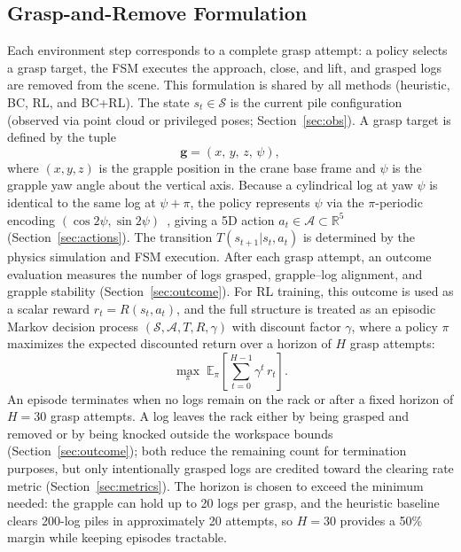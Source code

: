 \documentclass[letterpaper, 10 pt, conference]{ieeeconf}
\begin{document}
\subsection{Grasp-and-Remove Formulation}
\label{sec:formulation}
Each environment step corresponds to a complete grasp attempt: a policy selects a grasp target, the FSM executes the approach, close, and lift, and grasped logs are removed from the scene.
This formulation is shared by all methods (heuristic, BC, RL, and BC+RL).
The state $s_t \in \mathcal{S}$ is the current pile configuration (observed via point cloud or privileged poses; Section~\ref{sec:obs}).
A grasp target is defined by the tuple
\begin{equation}
    \mathbf{g} = (x,\, y,\, z,\, \psi),
\end{equation}
where $(x, y, z)$ is the grapple position in the crane base frame and $\psi$ is the grapple yaw angle about the vertical axis.
Because a cylindrical log at yaw $\psi$ is identical to the same log at $\psi + \pi$, the policy represents $\psi$ via the $\pi$-periodic encoding $(\cos 2\psi, \sin 2\psi)$~\cite{morrison2018closing}, giving a 5D action $a_t \in \mathcal{A} \subset \mathbb{R}^5$ (Section~\ref{sec:actions}).
The transition $T(s_{t+1}|s_t, a_t)$ is determined by the physics simulation and FSM execution.
After each grasp attempt, an outcome evaluation measures the number of logs grasped, grapple--log alignment, and grapple stability (Section~\ref{sec:outcome}).
For RL training, this outcome is used as a scalar reward $r_t = R(s_t, a_t)$, and the full structure is treated as an episodic Markov decision process $(\mathcal{S}, \mathcal{A}, T, R, \gamma)$ with discount factor $\gamma$, where a policy $\pi$ maximizes the expected discounted return over a horizon of $H$ grasp attempts:
\begin{equation}
    \max_\pi \; \mathbb{E}_\pi \!\left[\sum_{t=0}^{H-1} \gamma^t \, r_t \right].
\end{equation}
An episode terminates when no logs remain on the rack or after a fixed horizon of $H=30$ grasp attempts.
A log leaves the rack either by being grasped and removed or by being knocked outside the workspace bounds (Section~\ref{sec:outcome}); both reduce the remaining count for termination purposes, but only intentionally grasped logs are credited toward the clearing rate metric (Section~\ref{sec:metrics}).
The horizon is chosen to exceed the minimum needed: the grapple can hold up to 20 logs per grasp, and the heuristic baseline clears 200-log piles in approximately 20 attempts, so $H=30$ provides a 50\% margin while keeping episodes tractable.
\end{document}
